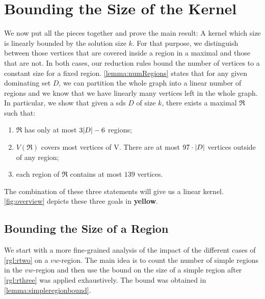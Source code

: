 \section{Bounding the Size of the Kernel}

We now put all the pieces together and prove the main result: A kernel which size is linearly bounded by the solution size $k$. 
For that purpose, we distinguish between those vertices that are covered inside a region in a maximal \dreg and those that are not. 
In both cases, our reduction rules bound the number of vertices to a constant size for a fixed region.
\cref{lemma:numRegions} states that for any given dominating set $D$, we can partition the whole graph into a linear number of regions and we know that we have linearly many vertices left in the whole graph.
In particular, we show that given a sds $D$ of size $k$, there exists a maximal \dreg $\mathfrak{R}$ such that:

\begin{enumerate}[topsep=0pt,itemsep=-1ex,partopsep=1ex,parsep=1ex]
    \item $\mathfrak{R}$ has only at most $3 \abs{D} - 6$ regions;
    \item $V(\mathfrak{R})$ covers most vertices of V. 
    There are at most $97 \cdot \abs{D}$ vertices outside of any region;
    \item each region of $\mathfrak{R}$ contains at most $139$ vertices.
\end{enumerate}

The combination of these three statements will give us a linear kernel. 
\cref{fig:overview} depicts these three goals in \textbf{\textcolor{MATHAYELLOW}{yellow}}.

\subsection{Bounding the Size of a Region}

We start with a more fine-grained analysis of the impact of the different cases of \cref{rgl:rtwo} on a $vw$-region. 
The main idea is to count the number of simple regions in the $vw$-region and then use the bound on the size of a simple region after \cref{rgl:rthree} was applied exhaustively. 
The bound was obtained in \cref{lemma:simpleregionbound}.   

